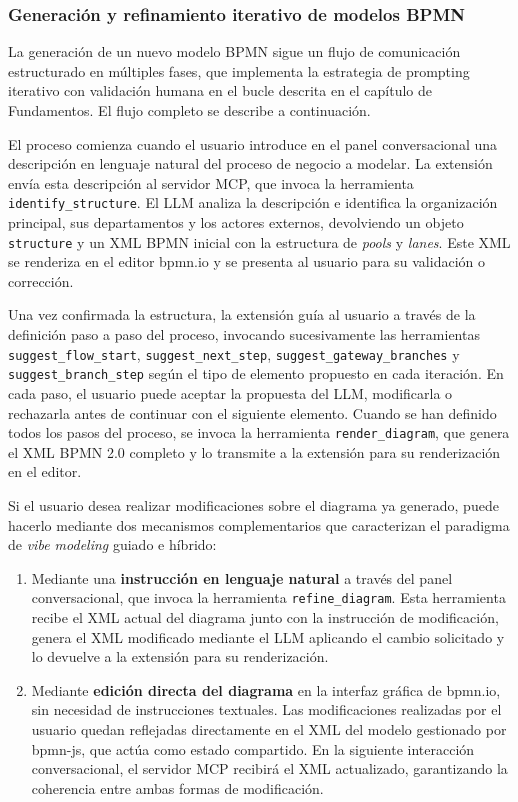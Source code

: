 \subsubsection{Generación y refinamiento iterativo de modelos BPMN}

La generación de un nuevo modelo BPMN sigue un flujo de comunicación estructurado en múltiples fases, que implementa la estrategia de prompting iterativo con validación humana en el bucle descrita en el capítulo de Fundamentos. El flujo completo se describe a continuación.

El proceso comienza cuando el usuario introduce en el panel conversacional una descripción en lenguaje natural del proceso de negocio a modelar. La extensión envía esta descripción al servidor MCP, que invoca la herramienta \texttt{identify\_structure}. El LLM analiza la descripción e identifica la organización principal, sus departamentos y los actores externos, devolviendo un objeto \texttt{structure} y un XML BPMN inicial con la estructura de \textit{pools} y \textit{lanes}. Este XML se renderiza en el editor bpmn.io y se presenta al usuario para su validación o corrección.

Una vez confirmada la estructura, la extensión guía al usuario a través de la definición paso a paso del proceso, invocando sucesivamente las herramientas \texttt{suggest\_flow\_start}, \texttt{suggest\_next\_step}, \texttt{suggest\_gateway\_branches} y \texttt{suggest\_branch\_step} según el tipo de elemento propuesto en cada iteración. En cada paso, el usuario puede aceptar la propuesta del LLM, modificarla o rechazarla antes de continuar con el siguiente elemento. Cuando se han definido todos los pasos del proceso, se invoca la herramienta \texttt{render\_diagram}, que genera el XML BPMN 2.0 completo y lo transmite a la extensión para su renderización en el editor.

Si el usuario desea realizar modificaciones sobre el diagrama ya generado, puede hacerlo mediante dos mecanismos complementarios que caracterizan el paradigma de \textit{vibe modeling} guiado e híbrido:

\begin{enumerate}
    \item Mediante una \textbf{instrucción en lenguaje natural} a través del panel conversacional, que invoca la herramienta \texttt{refine\_diagram}. Esta herramienta recibe el XML actual del diagrama junto con la instrucción de modificación, genera el XML modificado mediante el LLM aplicando el cambio solicitado y lo devuelve a la extensión para su renderización.

    \item Mediante \textbf{edición directa del diagrama} en la interfaz gráfica de bpmn.io, sin necesidad de instrucciones textuales. Las modificaciones realizadas por el usuario quedan reflejadas directamente en el XML del modelo gestionado por bpmn-js, que actúa como estado compartido. En la siguiente interacción conversacional, el servidor MCP recibirá el XML actualizado, garantizando la coherencia entre ambas formas de modificación.
\end{enumerate}


